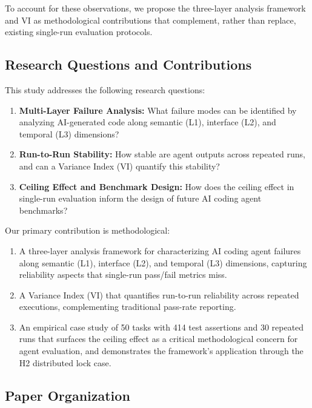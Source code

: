 \documentclass[conference]{IEEEtran}
\begin{document}
To account for these observations, we propose the three-layer analysis framework and VI as methodological contributions that complement, rather than replace, existing single-run evaluation protocols.

\subsection{Research Questions and Contributions}

This study addresses the following research questions:

\begin{enumerate}[leftmargin=*,label=RQ\arabic*:]
 \item \textbf{Multi-Layer Failure Analysis:} What failure modes can be identified by analyzing AI-generated code along semantic (L1), interface (L2), and temporal (L3) dimensions?
 \item \textbf{Run-to-Run Stability:} How stable are agent outputs across repeated runs, and can a Variance Index (VI) quantify this stability?
 \item \textbf{Ceiling Effect and Benchmark Design:} How does the ceiling effect in single-run evaluation inform the design of future AI coding agent benchmarks?
\end{enumerate}

Our primary contribution is methodological:

\begin{enumerate}
 \item A three-layer analysis framework for characterizing AI coding agent failures along semantic (L1), interface (L2), and temporal (L3) dimensions, capturing reliability aspects that single-run pass/fail metrics miss.
 \item A Variance Index (VI) that quantifies run-to-run reliability across repeated executions, complementing traditional pass-rate reporting.
 \item An empirical case study of 50 tasks with 414 test assertions and 30 repeated runs that surfaces the ceiling effect as a critical methodological concern for agent evaluation, and demonstrates the framework's application through the H2 distributed lock case.
\end{enumerate}

\subsection{Paper Organization}
\end{document}
